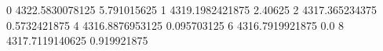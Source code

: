 0 4322.5830078125 5.791015625
1 4319.1982421875 2.40625
2 4317.365234375 0.5732421875
4 4316.8876953125 0.095703125
6 4316.7919921875 0.0
8 4317.7119140625 0.919921875
